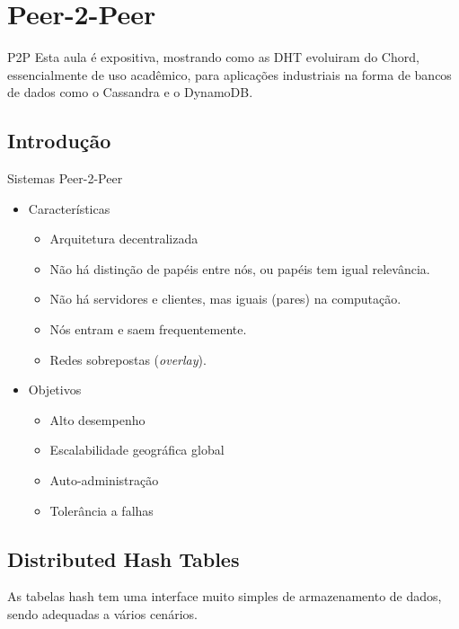 \section{Peer-2-Peer}{P2P}
Esta aula é expositiva, mostrando como as DHT evoluiram do Chord,  essencialmente de uso acadêmico, para aplicações industriais na forma de bancos de dados como o Cassandra e o DynamoDB.

\subsection[Intro]{Introdução}

\begin{frame}{Sistemas Peer-2-Peer}
\begin{itemize}
	\item Características
	\begin{itemize}
	\item Arquitetura decentralizada
	\item Não há distinção de papéis entre nós, ou papéis tem igual relevância.
	\item Não há servidores e clientes, mas iguais (pares) na computação.
	\item Nós entram e saem frequentemente.
	\item Redes sobrepostas (\emph{overlay}).
	\end{itemize}
	\item Objetivos
	\begin{itemize}
	\item Alto desempenho
	\item Escalabilidade geográfica global
	\item Auto-administração
	\item Tolerância a falhas
	\end{itemize}
\end{itemize}
\end{frame}

\subsection[DHT]{Distributed Hash Tables}

As tabelas hash tem uma interface muito simples de armazenamento de dados, sendo adequadas a vários cenários.

